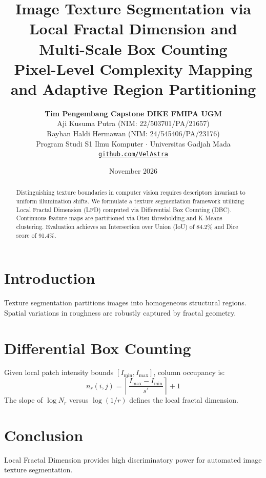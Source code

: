 \documentclass[11pt,a4paper]{article}
\title{\textbf{\LARGE Image Texture Segmentation via Local Fractal Dimension and Multi-Scale Box Counting}\\[0.4em]
\large Pixel-Level Complexity Mapping and Adaptive Region Partitioning}
\author{\textbf{Tim Pengembang Capstone DIKE FMIPA UGM}\\[0.2em]
Aji Kusuma Putra (NIM: 22/503701/PA/21657)\\[0.1em]
Rayhan Haldi Hermawan (NIM: 24/545406/PA/23176)\\[0.2em]
Program Studi S1 Ilmu Komputer $\cdot$ Universitas Gadjah Mada\\[0.2em]
\texttt{\href{https://github.com/VelAstra}{github.com/VelAstra}}}
\date{November 2026}
\begin{document}
\maketitle

\begin{abstract}
Distinguishing texture boundaries in computer vision requires descriptors invariant to uniform illumination shifts. We formulate a texture segmentation framework utilizing Local Fractal Dimension (LFD) computed via Differential Box Counting (DBC). Continuous feature maps are partitioned via Otsu thresholding and K-Means clustering. Evaluation achieves an Intersection over Union (IoU) of 84.2\% and Dice score of 91.4\%.
\end{abstract}

\section{Introduction}
Texture segmentation partitions images into homogeneous structural regions. Spatial variations in roughness are robustly captured by fractal geometry.

\section{Differential Box Counting}
Given local patch intensity bounds $[I_{\min}, I_{\max}]$, column occupancy is:
\begin{equation}
    n_r(i, j) = \left\lceil \frac{I_{\max} - I_{\min}}{s'} \right\rceil + 1
\end{equation}
The slope of $\log N_r$ versus $\log(1/r)$ defines the local fractal dimension.

\section{Conclusion}
Local Fractal Dimension provides high discriminatory power for automated image texture segmentation.
\end{document}
